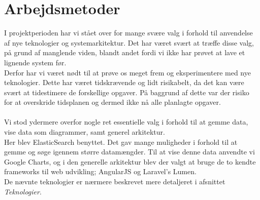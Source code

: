 \section{Arbejdsmetoder}
I projektperioden har vi stået over for mange svære valg i forhold til anvendelse af nye teknologier og systemarkitektur.
Det har været svært at træffe disse valg, på grund af manglende viden, blandt andet fordi vi ikke har prøvet at lave et lignende system før.
\\
Derfor har vi været nødt til at prøve os meget frem og eksperimentere med nye teknologier. Dette har været tidskrævende og
lidt risikabelt, da det kan være svært at tidestimere de forskellige opgaver.
På baggrund af dette var der risiko for at overskride tidsplanen og dermed ikke nå alle planlagte opgaver.
\\\\
Vi stod ydermere overfor nogle ret essentielle valg i forhold til at gemme data, vise data som diagrammer, samt generel arkitektur.
\\
Her  blev ElasticSearch benyttet. Det gav mange muligheder i forhold til at gemme og søge igennem større datamængder. Til at vise
denne data anvendte vi Google Charts, og i den generelle arkitektur blev der valgt at bruge de to kendte frameworks til web udvikling; AngularJS og Laravel's Lumen.
\\
De nævnte teknologier er nærmere beskrevet mere detaljeret i afsnittet \textit{Teknologier}.
